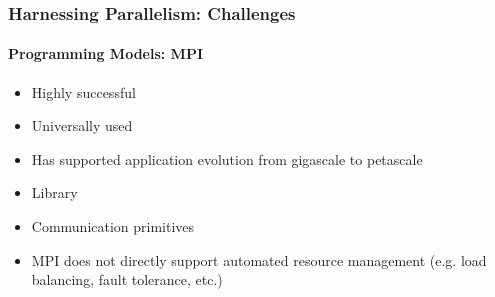 \begin{frame}[t]
\frametitle{Harnessing Parallelism: Challenges}
\framesubtitle{Programming Models: MPI}
  \begin{itemize}
    \item Highly successful
    \item Universally used
    \item Has supported application evolution from gigascale to petascale
  \end{itemize}
  \begin{itemize}
    \item Library
    \item Communication primitives
  \end{itemize}
  \begin{itemize}
    \item MPI does not directly support automated resource management
      (e.g. load balancing, fault tolerance, etc.)
  \end{itemize}
\end{frame}



%     


%     

